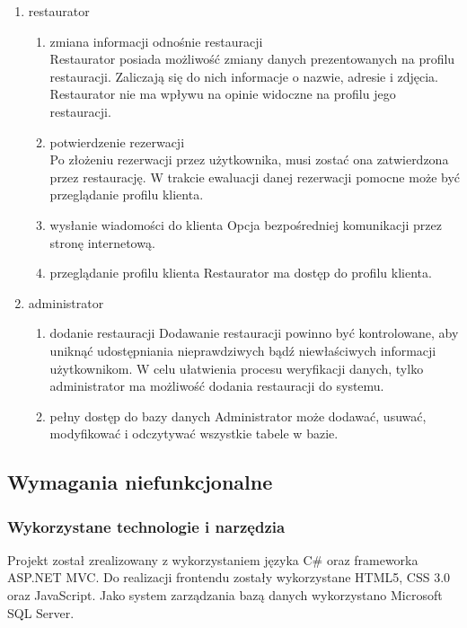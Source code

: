 \documentclass{article}
\begin{document}
\begin{enumerate}
\begin{enumerate}
\end{enumerate}
\item restaurator
\begin{enumerate}
	\item zmiana informacji odnośnie restauracji \\
	Restaurator posiada możliwość zmiany danych prezentowanych na profilu restauracji. Zaliczają się do nich informacje o nazwie, adresie i zdjęcia. Restaurator nie ma wpływu na opinie widoczne na profilu jego restauracji.
	\item potwierdzenie rezerwacji \\
	Po złożeniu rezerwacji przez użytkownika, musi zostać ona zatwierdzona przez restaurację. W trakcie ewaluacji danej rezerwacji pomocne może być przeglądanie profilu klienta.
	\item wysłanie wiadomości do klienta
	Opcja bezpośredniej komunikacji przez stronę internetową.
	\item przeglądanie profilu klienta
	Restaurator ma dostęp do profilu klienta.
\end{enumerate}
\item administrator
\begin{enumerate}
	\item dodanie restauracji
	Dodawanie restauracji powinno być kontrolowane, aby uniknąć udostępniania nieprawdziwych bądź niewłaściwych informacji użytkownikom. W celu ułatwienia procesu weryfikacji danych, tylko administrator ma możliwość dodania restauracji do systemu.
	\item pełny dostęp do bazy danych
	Administrator może dodawać, usuwać, modyfikować i odczytywać wszystkie tabele w bazie. 
\end{enumerate}
\end{enumerate}


\subsection{Wymagania niefunkcjonalne}

\subsubsection{Wykorzystane technologie i narzędzia}

Projekt został zrealizowany z wykorzystaniem języka C\# oraz frameworka ASP.NET MVC. Do realizacji frontendu zostały wykorzystane HTML5, CSS 3.0 oraz JavaScript. Jako system zarządzania bazą danych wykorzystano Microsoft SQL Server.
\end{document}
